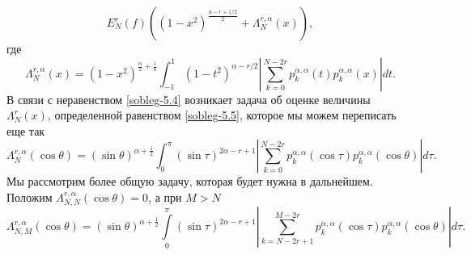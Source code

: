 \begin{equation}\label{sobleg-5.4}
E_N^r(f)\left((1-x^2)^\frac{\alpha-r+1/2}{2}+\Lambda^{r,\alpha}_N(x)\right),
\end{equation}
где
\begin{equation}\label{sobleg-5.5}
\Lambda^{r,\alpha}_N(x)=(1-x^2)^{\frac{\alpha}{2}+\frac14}  \int_{-1}^1(1-t^2)^{\alpha-r/2} \left|\sum_{k=0}^{N-2r}p_{k}^{\alpha,\alpha}(t)p_{k}^{\alpha,\alpha}(x)\right|dt.
\end{equation}
В связи с неравенством \eqref{sobleg-5.4} возникает задача об оценке величины $\Lambda^r_N(x)$, определенной равенством \eqref{sobleg-5.5}, которое мы можем переписать еще так
\begin{equation}\label{sobleg-5.6}
\Lambda^{r,\alpha}_N(\cos\theta)=(\sin\theta)^{\alpha+\frac12}  \int_{0}^\pi(\sin\tau)^{2\alpha-r+1} \left|\sum_{k=0}^{N-2r}
p_{k}^{\alpha,\alpha}(\cos\tau)p_{k}^{\alpha,\alpha}(\cos\theta)\right|d\tau.
\end{equation}
Мы рассмотрим   более общую задачу, которая будет нужна в дальнейшем. Положим $\Lambda^{r,\alpha}_{N,N}(\cos\theta)=0$, а  при $M>N$
\begin{equation}\label{sobleg-5.7}
\Lambda^{r,\alpha}_{N,M}(\cos\theta)=(\sin\theta)^{\alpha+\frac12}  \int\limits_{0}^\pi(\sin\tau)^{2\alpha-r+1} \left|\sum_{k=N-2r+1}^{M-2r}
p_{k}^{\alpha,\alpha}(\cos\tau)p_{k}^{\alpha,\alpha}(\cos\theta)\right|d\tau.
\end{equation}


